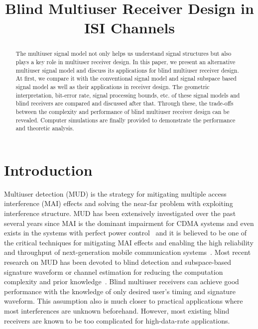 \documentclass[conference]{IEEEtran}
\begin{document}
\title{Blind Multiuser Receiver Design in ISI Channels}

\author{
 \and
{}
}

\date{}
\maketitle
\begin{abstract}\small
The multiuser signal model not only helps us understand signal
structures but also plays a key role in multiuser receiver design.
In this paper, we present an alternative multiuser signal model
and discuss its applications for blind multiuser receiver design.
At first, we compare it with the conventional signal model and
signal subspace based signal model as well as their applications
in receiver design. The geometric interpretation, bit-error rate,
signal processing bounds, etc. of these signal models and blind
receivers are compared and discussed after that. Through these,
the trade-offs between the complexity and performance of blind
multiuser receiver design can be revealed. Computer simulations
are finally provided to demonstrate the performance and theoretic
analysis.
\end{abstract}

\section{Introduction}
Multiuser detection (MUD) is the strategy for mitigating multiple
access interference (MAI) effects and solving the near-far problem
with exploiting interference structure. MUD has been extensively
investigated over the past several years since MAI is the dominant
impairment for CDMA systems and even exists in the systems with
perfect power control~\cite{Verd98} and it is believed to be one
of the critical techniques for mitigating MAI effects and enabling
the high reliability and throughput of next-generation mobile
communication systems~\cite{Andr05}. Most recent research on MUD
has been devoted to blind detection and subspace-based signature
waveform or channel estimation for reducing the computation
complexity and prior
knowledge~\cite{Honi95,Torl97,Wang98,Zhang02,Wang03d,Wang05A,Wang05B}.
Blind multiuser receivers can achieve good performance with the
knowledge of only desired user's timing and signature waveform.
This assumption also is much closer to practical applications
where most interferences are unknown beforehand. However, most
existing blind receivers are known to be too complicated for
high-data-rate applications.
\end{document}
